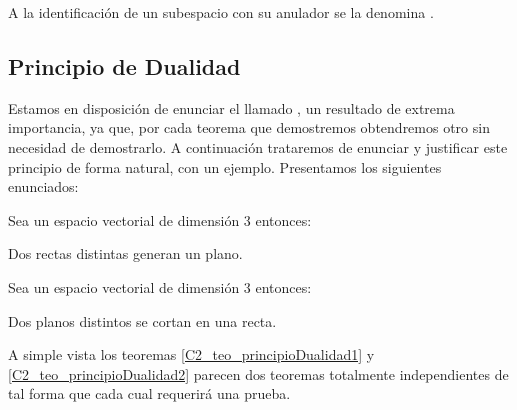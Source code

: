 A la identificación de un subespacio con su anulador se la denomina .
\subsection{Principio de Dualidad}
\label{C2_principioDualidadLineal}

Estamos en disposición de enunciar el llamado , un resultado de extrema importancia, ya que, por cada teorema que demostremos obtendremos otro sin necesidad de demostrarlo. A continuación trataremos de enunciar y justificar este principio de forma natural, con un ejemplo. Presentamos los siguientes enunciados:
\begin{theo}
	\label{C2_teo_principioDualidad1}
	Sea un espacio vectorial de dimensión $3$ entonces:
	
	Dos rectas distintas generan un plano.
\end{theo}
\begin{theo}
	\label{C2_teo_principioDualidad2}
	Sea un espacio vectorial de dimensión $3$ entonces:
	
	Dos planos distintos se cortan en una recta.
\end{theo}
A simple vista los teoremas \ref{C2_teo_principioDualidad1} y \ref{C2_teo_principioDualidad2} parecen dos teoremas totalmente independientes de tal forma que cada cual requerirá una prueba.

